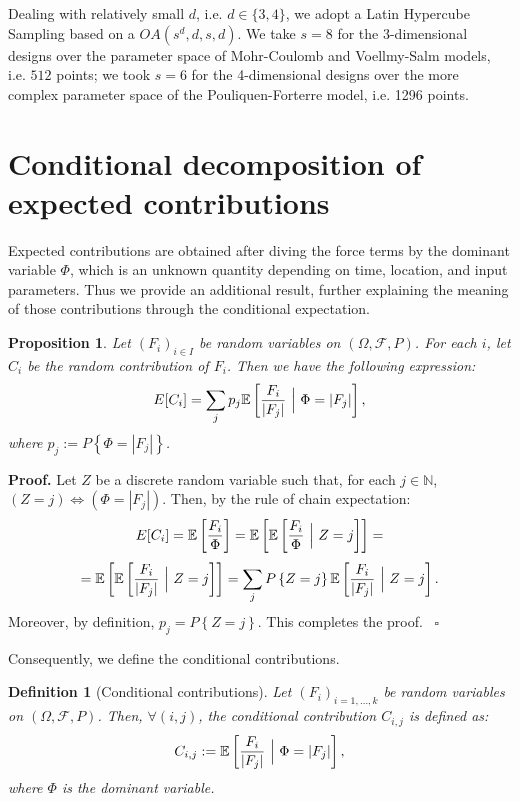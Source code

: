 \documentclass{article}
\newtheorem{definition}[theorem]{Definition}
\newtheorem{proposition}[theorem]{Proposition}
\newenvironment{proof}[1][Proof]{\noindent\textbf{#1.} }{\ $\square$}
\begin{document}

Dealing with relatively small $d$, i.e. $d\in\{3,4\}$, we adopt a Latin Hypercube Sampling based on a $OA(s^d,d,s,d)$. We take $s=8$ for the 3-dimensional designs over the parameter space of Mohr-Coulomb and Voellmy-Salm models, i.e. $512$ points; we took $s=6$ for the 4-dimensional designs over the more complex parameter space of the Pouliquen-Forterre model, i.e. 1296 points.

\section{Conditional decomposition of expected contributions}\label{A-2}
Expected contributions are obtained after diving the force terms by the dominant variable $\Phi$, which is an unknown quantity depending on time, location, and input parameters. Thus we provide an additional result, further explaining the meaning of those contributions through the conditional expectation.

\begin{proposition}
Let $(F_i)_{i\in I}$ be random variables on $(\Omega, \mathcal F, P)$. For each $i$, let $C_i$ be the random contribution of $F_i$. Then we have the following expression:
$$E[C_i]=\sum_j p_j \mathbb E\left[\frac{F_i}{|F_j|}\ \Big{|}\ \Phi=|F_j|\right],$$
where $p_j:=P\left\{\Phi=|F_j|\right\}$.
\end{proposition}

\begin{proof}
Let $Z$ be a discrete random variable such that, for each $j\in\mathbb N$, $(Z=j) \Longleftrightarrow (\Phi=|F_j|)$. Then, by the rule of chain expectation:
$$E[C_i]=\mathbb E\left[\frac{F_i}{\Phi}\right]=\mathbb E\left[\mathbb E\left[\frac{F_i}{\Phi}\ \Big{|}\ Z=j\right]\right]=$$
$$=\mathbb E\left[\mathbb E\left[\frac{F_i}{|F_j|}\ \Big{|}\ Z=j\right]\right]=\sum_j P\left\{Z=j\right\} \mathbb E\left[\frac{F_i}{|F_j|}\ \Big{|}\ Z=j\right].$$
Moreover, by definition, $p_j=P\left\{Z=j\right\}$. This completes the proof.
\end{proof}

Consequently, we define the conditional contributions.

\begin{definition}[Conditional contributions]
Let $(F_i)_{i=1,\dots, k}$ be random variables on $(\Omega, \mathcal F, P)$. Then, $\forall (i,j)$, the conditional contribution $C_{i,j}$ is defined as:
$$C_{i,j}:=\mathbb E\left[\frac{F_i}{|F_j|}\ \Big{|}\ \Phi=|F_j|\right],$$
where $\Phi$ is the dominant variable.
\end{definition}



\end{document}
